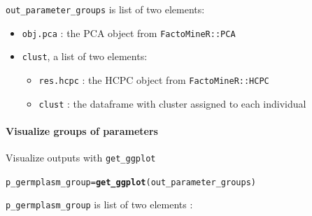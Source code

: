 \documentclass{book}\usepackage[]{graphicx}\usepackage[]{color}
\makeatletter
\newcommand{\hlstd}[1]{\textcolor[rgb]{0.345,0.345,0.345}{#1}}%
\newcommand{\hlkwb}[1]{\textcolor[rgb]{0.69,0.353,0.396}{#1}}%
\newcommand{\hlkwd}[1]{\textcolor[rgb]{0.737,0.353,0.396}{\textbf{#1}}}%
\newenvironment{kframe}{%
 \def\at@end@of@kframe{}%
 \ifinner\ifhmode%
  \def\at@end@of@kframe{\end{minipage}}%
  \begin{minipage}{\columnwidth}%
 \fi\fi%
 \def\FrameCommand##1{\hskip\@totalleftmargin \hskip-\fboxsep
 \colorbox{shadecolor}{##1}\hskip-\fboxsep
     \hskip-\linewidth \hskip-\@totalleftmargin \hskip\columnwidth}%
 \MakeFramed {\advance\hsize-\width
   \@totalleftmargin\z@ \linewidth\hsize
   \@setminipage}}%
 {\par\unskip\endMakeFramed%
 \at@end@of@kframe}
\newenvironment{knitrout}{}{} %
\makeatother
\begin{document}
\texttt{out\_parameter\_groups} is list of two elements:

\begin{itemize}
\item\texttt{obj.pca} : the PCA object from \texttt{FactoMineR::PCA}
\item \texttt{clust}, a list of two elements:
\begin{itemize}
  \item \texttt{res.hcpc} : the HCPC object from \texttt{FactoMineR::HCPC}
  \item \texttt{clust} : the dataframe with cluster assigned to each individual
  \end{itemize}
\end{itemize}

\paragraph{Visualize groups of parameters}

Visualize outputs with \texttt{get\_ggplot}

\begin{knitrout}
\color{fgcolor}\begin{kframe}
\begin{alltt}
\hlstd{p_germplasm_group} \hlkwb{=} \hlkwd{get_ggplot}\hlstd{(out_parameter_groups)}
\end{alltt}
\end{kframe}
\end{knitrout}

\texttt{p\_germplasm\_group} is list of two elements :
\end{document}
